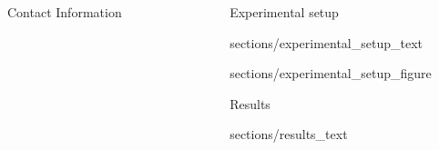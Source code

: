 \documentclass[final]{beamer}
\newlength{\sepwid}
\newlength{\onecolwid}
\newlength{\twocolwid}
\begin{document}
\begin{frame}[t]
\begin{columns}[t]
\begin{column}{\twocolwid}
\begin{block}{Contact Information}
	\end{block}

\end{column}

\begin{column}{\sepwid}\end{column} %

\begin{column}{\twocolwid}


\begin{block}{Experimental setup}

%
%		
%
%
%		
%

{sections/experimental_setup_text}

{sections/experimental_setup_figure}

\end{block}



\begin{block}{Results}

{sections/results_text}


\end{block}

\vspace{-1.3cm}

\begin{columns}[t,totalwidth=\twocolwid]


\end{columns}
\end{column}
\end{columns}
\end{frame}
\end{document}
